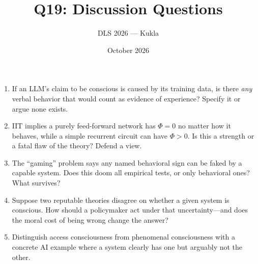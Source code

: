 \documentclass[11pt]{article}
\title{Q19: Discussion Questions}
\author{DLS 2026 --- Kukla}
\date{October 2026}
\begin{document}
\maketitle
\begin{enumerate}[leftmargin=1.5em]
\item If an LLM's claim to be conscious is caused by its training data, is there \emph{any} verbal behavior that would count as evidence of experience? Specify it or argue none exists.
\item IIT implies a purely feed-forward network has $\Phi=0$ no matter how it behaves, while a simple recurrent circuit can have $\Phi>0$. Is this a strength or a fatal flaw of the theory? Defend a view.
\item The ``gaming'' problem says any named behavioral sign can be faked by a capable system. Does this doom all empirical tests, or only behavioral ones? What survives?
\item Suppose two reputable theories disagree on whether a given system is conscious. How should a policymaker act under that uncertainty---and does the moral cost of being wrong change the answer?
\item Distinguish access consciousness from phenomenal consciousness with a concrete AI example where a system clearly has one but arguably not the other.
\end{enumerate}
\end{document}
